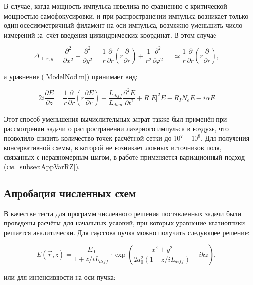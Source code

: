 В случае, когда мощность импульса невелика по сравнению с критической мощностью самофокусировки,
и при распространении импульса возникает только один осесимметричный филамент на оси импульса, возможно уменьшить число измерений
за~счёт введения цилиндрических координат. В этом случае

\begin{equation}
\Delta_{\perp x,y} = \dfrac{\partial^2}{\partial x^2} + \dfrac{\partial^2}{\partial y^2} =
\dfrac{1}{r}\dfrac{\partial}{\partial r}\left(r\dfrac{\partial}{\partial r}\right) + \dfrac{1}{r^2}\dfrac{\partial^2}{\partial \varphi^2} =
\simeq \dfrac{1}{r}\dfrac{\partial}{\partial r}\left(r\dfrac{\partial}{\partial r}\right),
\end{equation}

\noindent а уравнение (\ref{ModelNodim}) принимает вид:

\begin{equation}\label{ModelSimplifiedEquationAxial}
2 i \dfrac{\partial E}{\partial z} = \dfrac{1}{r}\dfrac{\partial}{\partial r}\left(r\dfrac{\partial E}{\partial r}\right)
- \dfrac{L_{diff}}{L_{disp}} \dfrac{\partial^2 E}{\partial t^2} + R |E|^2 E - R_{I} N_{e} E - i \alpha E
\end{equation}

Этот способ уменьшения вычислительных затрат также был применён при рассмотрении задачи о распространении лазерного импульса в воздухе,
что позволило снизить количество точек расчётной сетки до $10^7\textrm{ -- }10^8$. Для получения консервативной схемы, в которой не возникает ложных источников поля,
связанных с неравномерным шагом, в работе применяется вариационный подход (см. \ref{subsec:AppVarRZ}).


\subsection{Апробация численных схем}

В качестве теста для программ численного решения поставленных задачи были проведены расчёты для начальных условий,
при которых уравнение квазиоптики решается аналитически. Для гауссова пучка можно получить следующее решение:

\begin{equation}
E(\vec{r}, z) =  \frac{E_0}{1 + z/iL_{diff}} \cdot \exp\left(\frac{x^2 + y^2}{2 a_0^2(1 + z/iL_{diff})} - ikz\right),
\end{equation}

\noindent или для интенсивности на оси пучка:


